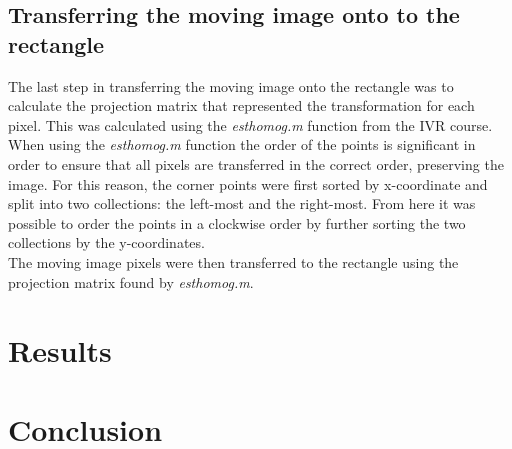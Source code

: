 \documentclass[11pt]{article}
\begin{document}
\subsection{Transferring the moving image onto to the rectangle}
The last step in transferring the moving image onto the rectangle was to calculate the projection matrix that represented the transformation for each pixel. This was calculated using the \emph{esthomog.m} function from the IVR course. When using the \emph{esthomog.m} function the order of the points is significant in order to ensure that all pixels are transferred in the correct order, preserving the image. For this reason, the corner points were first sorted by x-coordinate and split into two collections: the left-most and the right-most. From here it was possible to order the points in a clockwise order by further sorting the two collections by the y-coordinates. \\

The moving image pixels were then transferred to the rectangle using the projection matrix found by \emph{esthomog.m}.

\section{Results}


\section{Conclusion}
\end{document}
